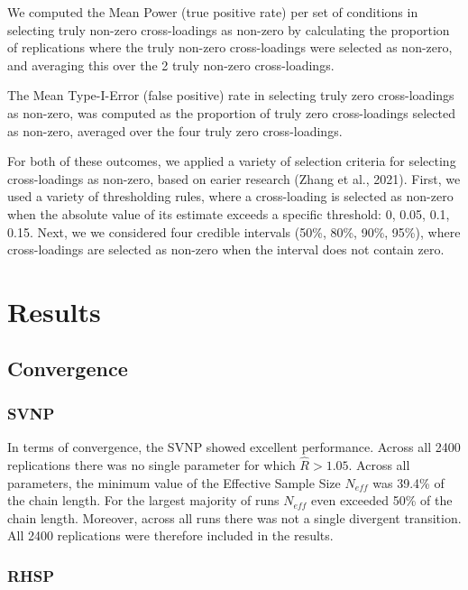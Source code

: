 \documentclass[
  english,
  man, donotrepeattitle,floatsintext]{apa6}
\begin{document}
We computed the Mean Power (true positive rate) per set of conditions in selecting truly non-zero cross-loadings as non-zero by calculating the proportion of replications where the truly non-zero cross-loadings were selected as non-zero, and averaging this over the 2 truly non-zero cross-loadings.

The Mean Type-I-Error (false positive) rate in selecting truly zero cross-loadings as non-zero, was computed as the proportion of truly zero cross-loadings selected as non-zero, averaged over the four truly zero cross-loadings.

For both of these outcomes, we applied a variety of selection criteria for selecting cross-loadings as non-zero, based on earier research (Zhang et al., 2021). First, we used a variety of thresholding rules, where a cross-loading is selected as non-zero when the absolute value of its estimate exceeds a specific threshold: 0, 0.05, 0.1, 0.15. Next, we we considered four credible intervals (50\%, 80\%, 90\%, 95\%), where cross-loadings are selected as non-zero when the interval does not contain zero.

\hypertarget{results}{%
\section{Results}\label{results}}

\hypertarget{convergence}{%
\subsection{Convergence}\label{convergence}}

\hypertarget{svnp}{%
\subsubsection{SVNP}\label{svnp}}

In terms of convergence, the SVNP showed excellent performance. Across all 2400 replications there was no single parameter for which \(\hat{R} > 1.05\). Across all parameters, the minimum value of the Effective Sample Size \(N_{eff}\) was 39.4\% of the chain length. For the largest majority of runs \(N_{eff}\) even exceeded 50\% of the chain length. Moreover, across all runs there was not a single divergent transition. All 2400 replications were therefore included in the results.

\hypertarget{rhsp}{%
\subsubsection{RHSP}\label{rhsp}}
\end{document}
